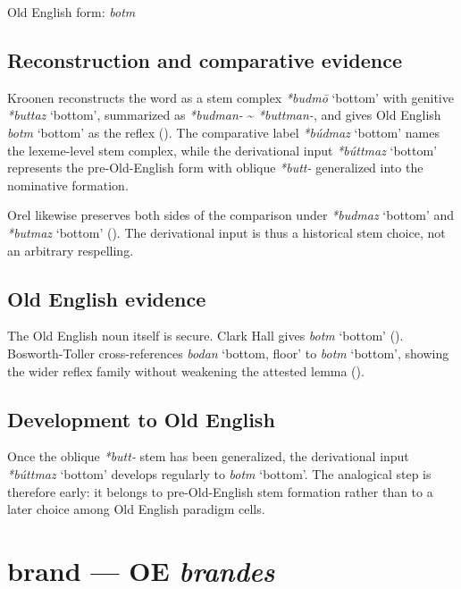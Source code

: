 \documentclass[
  british,
  a4paper,
  openany]{book}
\providecommand{\Recon}[1]{\emph{*#1}}
{\catcode`→=\active \global\def→{\ensuremath{\rightarrow}}}
\providecommand{\texorpdfstring}[2]{#1}
\providecommand{\Recon}[1]{\emph{*#1}}
{\catcode`→=\active \global\def→{\ensuremath{\rightarrow}}}
\begin{document}
Old English form: \emph{botm}

\subsection{Reconstruction and comparative
evidence}\label{reconstruction-and-comparative-evidence-74}

Kroonen reconstructs the word as a stem complex \Recon{budmō} `bottom'
with genitive \Recon{buttaz} `bottom', summarized as \emph{*budman-}
\textasciitilde{} \emph{*buttman-}, and gives Old English {\emph{botm}}
`bottom' as the reflex ().
The comparative label \Recon{búdmaz} `bottom' names the lexeme-level
stem complex, while the derivational input \Recon{búttmaz} `bottom'
represents the pre-Old-English form with oblique \emph{*butt-}
generalized into the nominative formation.

Orel likewise preserves both sides of the comparison under
\Recon{budmaz} `bottom' and \Recon{butmaz} `bottom'
(). The derivational input is
thus a historical stem choice, not an arbitrary respelling.

\subsection{Old English evidence}\label{old-english-evidence-74}

The Old English noun itself is secure. Clark Hall gives {\emph{botm}}
`bottom' ().
Bosworth-Toller cross-references {\emph{bodan}} `bottom, floor' to
{\emph{botm}} `bottom', showing the wider reflex family without
weakening the attested lemma ().

\subsection{Development to Old
English}\label{development-to-old-english-74}

Once the oblique \emph{*butt-} stem has been generalized, the
derivational input \Recon{búttmaz} `bottom' develops regularly to
{\emph{botm}} `bottom'. The analogical step is therefore early: it
belongs to pre-Old-English stem formation rather than to a later choice
among Old English paradigm cells.

\section{\texorpdfstring{brand --- OE
\emph{brandes}}{brand --- OE brandes}}\label{brand-oe-brandes}
\end{document}
